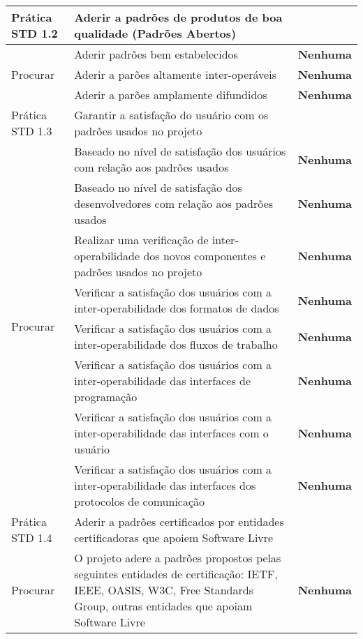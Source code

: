 \begin{longtable}{|p{2cm}|p{7cm}|p{7cm}|}
  \hline \cellcolor[gray]{0.9} Prática STD 1.2 & \cellcolor[gray]{0.9}
  Aderir a padrões de produtos de boa qualidade (Padrões Abertos) & \\
  \hline \multirow{3}{*}{Procurar} & Aderir padrões bem estabelecidos
  &
  \textbf{Nenhuma} \\
  \cline{2-3} & Aderir a parões altamente inter-operáveis &
  \textbf{Nenhuma} \\
  \cline{2-3} & Aderir a parões amplamente difundidos &
  \textbf{Nenhuma} \\
  \hline \cellcolor[gray]{0.9} Prática STD 1.3 & \cellcolor[gray]{0.9}
  Garantir a satisfação do usuário com os padrões usados no projeto & \\
  \hline \multirow{8}{*}{Procurar} & Baseado no nível de satisfação
  dos usuários com relação aos padrões usados &
  \textbf{Nenhuma} \\
  \cline{2-3} & Baseado no nível de satisfação dos desenvolvedores com
  relação aos padrões usados& \textbf{Nenhuma} \\
  \cline{2-3} & Realizar uma verificação de inter-operabilidade dos
  novos componentes e padrões usados no projeto & \textbf{Nenhuma} \\
  \cline{2-3} & Verificar a satisfação dos usuários com a
  inter-operabilidade dos formatos de dados & \textbf{Nenhuma} \\
  \cline{2-3} & Verificar a satisfação dos usuários com a
  inter-operabilidade dos fluxos de trabalho & \textbf{Nenhuma} \\
  \cline{2-3} & Verificar a satisfação dos usuários com a
  inter-operabilidade das interfaces de programação & \textbf{Nenhuma}
  \\
  \cline{2-3} & Verificar a satisfação dos usuários com a
  inter-operabilidade das interfaces com o usuário & \textbf{Nenhuma}
  \\
  \cline{2-3} & Verificar a satisfação dos usuários com a
  inter-operabilidade das interfaces dos protocolos de comunicação &
  \textbf{Nenhuma} \\
  \hline \cellcolor[gray]{0.9} Prática STD 1.4 & \cellcolor[gray]{0.9}
  Aderir a padrões certificados por entidades certificadoras que
  apoiem Software Livre & \\
  \hline \multirow{1}{*}{Procurar} & O projeto adere a padrões
  propostos pelas seguintes entidades de certificação: IETF, IEEE,
  OASIS, W3C, Free Standards Group, outras entidades que apoiam
  Software Livre &
  \textbf{Nenhuma} \\

\end{longtable}
